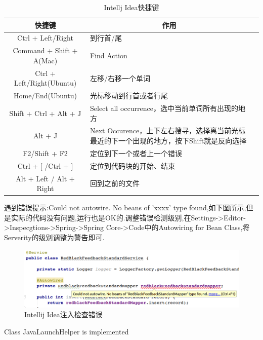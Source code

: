 \documentclass[12pt]{book}
\makeatletter
\numberwithin{dummy}{section}
\theoremstyle{ocrenumbox}
\theoremstyle{blacknumex}
\theoremstyle{blacknumbox}
\theoremstyle{ocrenum}
\renewcommand\paragraph{\@startsection{paragraph}{4}{\z@}
	{-2ex \@plus-.2ex \@minus .2ex}
	{.1ex}
	{\normalfont\small\sffamily\bfseries}}
\makeatother
\begin{document}
\begin{table}
	\begin{center}
		\caption{Intellj Idea快捷键}
		\bigskip
		\label{table:intellijideashortkeys}
		\begin{tabular}{cp{8cm}c}
			\hline
			\multirow{1}{*}{快捷键}
			& \multicolumn{1}{c}{作用}  \\
			\hline			
			Ctrl + Left/Right & 到行首/尾 \\
			Command + Shift + A(Mac) & Find Action \\
			Ctrl + Left/Right(Ubuntu) & 左移/右移一个单词\\
			Home/End(Ubuntu) & 光标移动到行首或者行尾\\
			Shift + Ctrl + Alt + J & Select all occurrence，选中当前单词所有出现的地方\\
			Alt + J & Next Occurence，上下左右搜寻，选择离当前光标最近的下一个出现的地方，按下Shift就是反向选择\\	
			F2/Shift + F2 & 定位到下一个或者上一个错误 \\
			Ctrl + [ /Ctrl + ] & 定位到代码块的开始、结束 \\
			Alt + Left / Alt + Right & 回到之前的文件\\
			\hline
		\end{tabular}
	\end{center}
\end{table}


遇到错误提示:Could not autowire. No beans of 'xxxx' type found,如下图所示,但是实际的代码没有问题,运行也是OK的.调整错误检测级别,在Settings->Editor->Inspecgtions->Spring->Spring Core->Code中的Autowiring for Bean Class,将Serverity的级别调整为警告即可.

\begin{figure}[htbp]
	\centering
	\includegraphics[scale=0.45]{autowiredcheckerror.png}
	\caption{Intellij Idea注入检查错误}
	\label{fig:autowiredcheckerror}
\end{figure}


\paragraph{Class JavaLaunchHelper is implemented}
\end{document}
